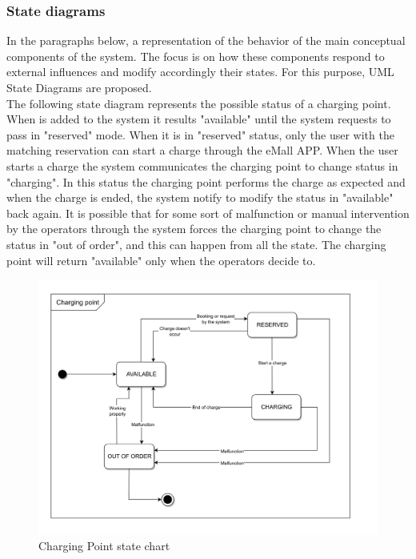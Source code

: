 \subsubsection{State diagrams}
In the paragraphs below, a representation of the behavior of the main conceptual
components of the system. The focus is on how these components respond to
external influences and modify accordingly their states. For this purpose, UML State Diagrams are proposed.\\
The following state diagram represents the possible status of a charging point.
When is added to the system it results "available" until the system requests to pass in "reserved" mode.
When it is in "reserved" status, only the user with the matching reservation can start a charge through the eMall APP.
When the user starts a charge the system communicates the charging point to change status in "charging". In this status
the charging point performs the charge as expected and when the charge is ended, the system notify to modify the status
in "available" back again. It is possible that for some sort of malfunction or manual intervention
by the operators through the system forces the charging point to change the status in "out of order", and this can happen from all the state. The charging point will return "available"
only when the operators decide to.
\begin{figure}[H]
      \centering
      \includegraphics[scale=0.25]{src/state_diagram/cp.png}
      \caption{Charging Point state chart}
\end{figure} \vspace{1cm}


